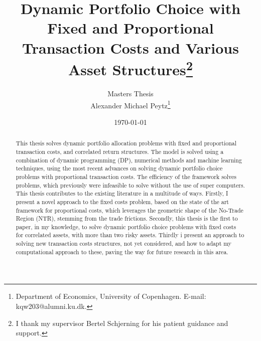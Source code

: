 \documentclass[11pt]{article}
\author{Masters Thesis\\
	Alexander Michael Peytz\footnote{Department of Economics, University of Copenhagen. E-mail: kqw203@alumni.ku.dk.}}
\title{Dynamic Portfolio Choice with Fixed and Proportional Transaction Costs and Various Asset Structures\footnote{I thank my supervisor Bertel Schjerning for his patient guidance and support.}}
\date{\today}
\begin{document}
% 


\clearpage
\setcounter{page}{1}

\maketitle
\renewcommand*{\thefootnote}{\fnsymbol{footnote}}

\begin{abstract}
\noindent This thesis solves dynamic portfolio allocation problems with fixed and proportional transaction costs,
and correlated return structures. The model is solved using a combination of dynamic programming (DP), numerical methods and machine learning techniques,
using the most recent advances on solving dynamic portfolio choice problems with proportional transaction costs.
The efficiency of the framework solves problems, which previously were infeasible to solve without the use of super computers.
This thesis contributes to the existing literature in a multitude of ways. Firstly,
I present a novel approach to the fixed costs problem, based on the state of the art framework for proportional costs,
which leverages the geometric shape of the No-Trade Region (NTR), stemming from the trade frictions.
Secondly, this thesis is the first to paper, in my knowledge, to solve dynamic portfolio choice problems with fixed costs for correlated assets, with more than two risky assets.
Thirdly i present an approach to solving new transaction costs structures, not yet considered, and how to adapt my computational approach to these,
paving the way for future research in this area.
\end{abstract}

\newpage
\begingroup 
  \hypersetup{linkcolor=black}
  \tableofcontents
  \newpage
  \listoffigures
  \listoftables
  \printacronyms[sort=true, template=tabular, display=used]  
\endgroup
\newpage

\clearpage
{}
\renewcommand*{\thefootnote}{\arabic{footnote}}
\setcounter{footnote}{0}
\end{document}

